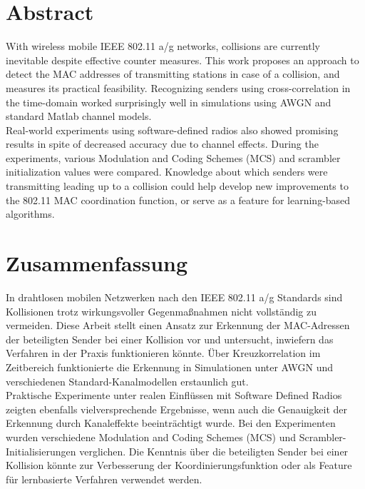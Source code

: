 

\begingroup
\let\clearpage\relax
\let\cleardoublepage\relax
\let\cleardoublepage\relax

\chapter*{Abstract}

With wireless mobile IEEE 802.11 a/g networks, collisions are currently inevitable despite effective counter measures. This work proposes an approach to detect the MAC addresses of transmitting stations in case of a collision, and measures its practical feasibility. Recognizing senders using cross-correlation in the time-domain worked surprisingly well in simulations using AWGN and standard Matlab channel models.\\

Real-world experiments using software-defined radios also showed promising results in spite of decreased accuracy due to channel effects. During the experiments, various Modulation and Coding Schemes (MCS) and scrambler initialization values were compared. Knowledge about which senders were transmitting leading up to a collision could help develop new improvements to the 802.11 MAC coordination function, or serve as a feature for learning-based algorithms.



\vfill
{}
\chapter*{Zusammenfassung}

In drahtlosen mobilen Netzwerken nach den IEEE 802.11 a/g Standards sind Kollisionen trotz wirkungsvoller Gegenmaßnahmen nicht vollständig zu vermeiden. Diese Arbeit stellt einen Ansatz zur Erkennung der MAC-Adressen der beteiligten Sender bei einer Kollision vor und untersucht, inwiefern das Verfahren in der Praxis funktionieren könnte. Über Kreuzkorrelation im Zeitbereich funktionierte die Erkennung in Simulationen unter AWGN und verschiedenen Standard-Kanalmodellen erstaunlich gut.\\

Praktische Experimente unter realen Einflüssen mit Software Defined Radios zeigten ebenfalls vielversprechende Ergebnisse, wenn auch die Genauigkeit der Erkennung durch Kanaleffekte beeinträchtigt wurde. Bei den Experimenten wurden verschiedene Modulation and Coding Schemes (MCS) und Scrambler-Initialisierungen verglichen. Die Kenntnis über die beteiligten Sender bei einer Kollision könnte zur Verbesserung der Koordinierungsfunktion oder als Feature für lernbasierte Verfahren verwendet werden.


\endgroup
\vfill
